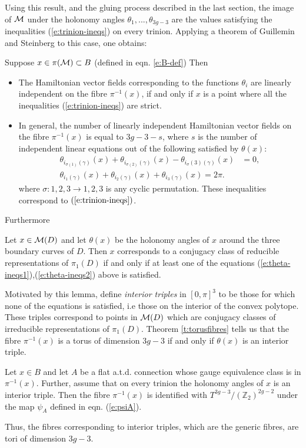 	Using this result, and the gluing process described in the last section, the image of $\mathcal{M}$ under the holonomy angles $\theta_1,...,\theta_{3g-3}$ are the values satisfying the inequalities (\ref{e:trinion-ineqs}) on every trinion. Applying a theorem of Guillemin and Steinberg \cite{guillemin_gelfand-cetlin_1983} to this case, one obtains:
	\begin{theorem}
		\label{t:torusfibres}
		Suppose $x\in \pi(\mathcal{M}) \subset B$ (defined in eqn. \ref{e:B-def}) Then
		\begin{itemize}
			\item The Hamiltonian vector fields corresponding to the functions $\theta_i$ are linearly independent on the fibre $\pi^{-1}(x)$, if and only if $x$ is a point where all the inequalities (\ref{e:trinion-ineqs}) are strict.
			\item In general, the number of linearly independent Hamiltonian vector fields on the fibre $\pi^{-1}(x)$ is equal to $3g-3-s$, where $s$ is the number of independent linear equations out of the following satisfied by $\theta(x)$:
				\begin{align}
					\label{e:theta-ineqs1}
					\theta_{i_{\sigma(1)}(\gamma)}(x) + \theta_{i_{\sigma(2)}(\gamma)}(x)-\theta_{i{_\sigma(3)}(\gamma)}(x)&=0,\\
					\theta_{i_1(\gamma)}(x) + \theta_{i_2(\gamma)}(x) + \theta_{i_3(\gamma)}(x) = 2\pi.
					\label{e:theta-ineqs2}
				\end{align}
			where $\sigma:{1,2,3}\to{1,2,3}$ is any cyclic permutation. These inequalities correspond to $(\ref{e:trinion-ineqs})$.
		\end{itemize}
	\end{theorem}
	Furthermore
	\begin{lemma}
		Let $x\in \mathcal{M}(D)$ and let $\theta(x)$ be the holonomy angles of $x$ around the three boundary curves of $D$. Then $x$ corresponds to a conjugacy class of reducible representations of $\pi_1(D)$ if and only if at least one of the equations (\ref{e:theta-ineqs1}),(\ref{e:theta-ineqs2}) above is satisfied.
	\end{lemma}
	Motivated by this lemma, define \emph{interior triples} in $[0,\pi]^3$ to be those for which none of the equations is satisfied, i.e those on the interior of the convex polytope. These triples correspond to points in $\mathcal{M}(D)$ which are conjugacy classes of irreducible representations of $\pi_1(D)$. Theorem \ref{t:torusfibres} tells us that the fibre $\pi^{-1}(x)$ is a torus of dimension $3g-3$ if and only if $\theta(x)$ is an interior triple.
	\begin{theorem}
		Let $x\in B$ and let $A$ be a flat a.t.d. connection whose gauge equivalence class is in $\pi^{-1}(x)$. Further, assume that on every trinion the holonomy angles of $x$ is an interior triple. Then the fibre $\pi^{-1}(x)$ is identified with $T^{3g-3}/(\mathbb{Z}_2)^{2g-2}$ under the map $\psi_A$ defined in eqn. (\ref{e:psiA}).
	\end{theorem}
	Thus, the fibres corresponding to interior triples, which are the generic fibres, are tori of dimension $3g-3$. 
	

